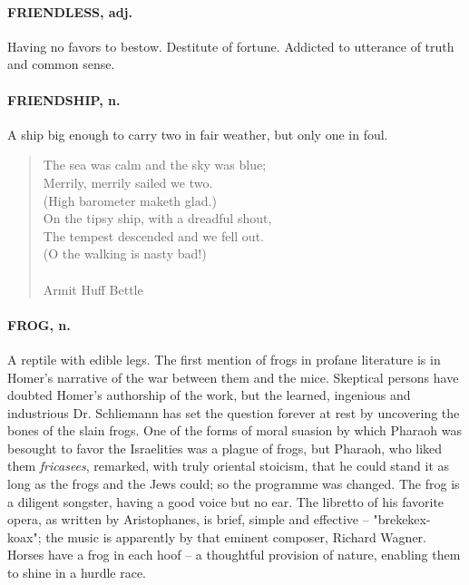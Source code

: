 \documentclass[11pt]{article}
\begin{document}
\paragraph{FRIENDLESS, adj.}  Having no favors to bestow.  Destitute of fortune.
Addicted to utterance of truth and common sense.

\paragraph{FRIENDSHIP, n.}  A ship big enough to carry two in fair weather, but
only one in foul.

\begin{quote}   The sea was calm and the sky was blue; \\
  Merrily, merrily sailed we two. \\
      (High barometer maketh glad.) \\
  On the tipsy ship, with a dreadful shout, \\
  The tempest descended and we fell out. \\
      (O the walking is nasty bad!) \\
 \\
Armit Huff Bettle \end{quote}


\paragraph{FROG, n.}  A reptile with edible legs.  The first mention of frogs in
profane literature is in Homer's narrative of the war between them and
the mice.  Skeptical persons have doubted Homer's authorship of the
work, but the learned, ingenious and industrious Dr. Schliemann has
set the question forever at rest by uncovering the bones of the slain
frogs.  One of the forms of moral suasion by which Pharaoh was
besought to favor the Israelities was a plague of frogs, but Pharaoh,
who liked them {\em fricasees}, remarked, with truly oriental stoicism,
that he could stand it as long as the frogs and the Jews could; so the
programme was changed.  The frog is a diligent songster, having a good
voice but no ear.  The libretto of his favorite opera, as written by
Aristophanes, is brief, simple and effective -- "brekekex-koax"; the
music is apparently by that eminent composer, Richard Wagner.  Horses
have a frog in each hoof -- a thoughtful provision of nature, enabling
them to shine in a hurdle race.
\end{document}
